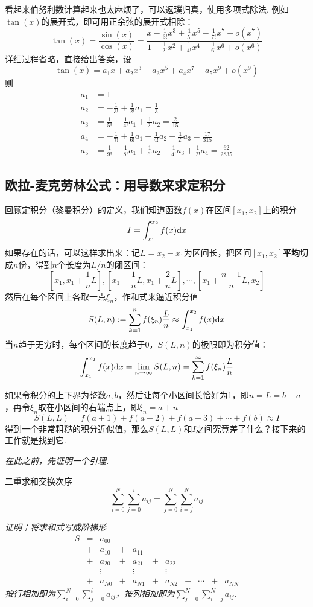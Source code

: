 \documentclass[main.tex]{subfiles}
\begin{document}
看起来伯努利数计算起来也太麻烦了，可以返璞归真，使用多项式除法. 例如\(\tan(x)\)的展开式，即可用正余弦的展开式相除：
\[ \tan(x) = \frac{\sin(x)}{\cos(x)} = \frac{x-\frac{1}{3!}x^3+\frac{1}{5!}x^5-\frac{1}{7!}x^7+o(x^7)} {1-\frac{1}{2!}x^2+\frac{1}{4!}x^4-\frac{1}{6!}x^6+o(x^6)}\]
详细过程省略，直接给出答案，设
\[ \tan(x) = a_1x+a_2x^3+a_3x^5+a_4x^7+a_5x^9+o(x^9)\]
则
\begin{align*}
    a_1 &= 1\\
    a_2 &= -\frac{1}{3!}+\frac{1}{2!}a_1 = \frac{1}{3} \\
    a_3 &= \frac{1}{5!}-\frac{1}{4!}a_1+\frac{1}{2!}a_2 = \frac{2}{15} \\
    a_4 &= -\frac{1}{7!}+\frac{1}{6!}a_1-\frac{1}{4!}a_2+\frac{1}{2!}a_3 = \frac{17}{315} \\
    a_5 &= \frac{1}{9!}-\frac{1}{8!}a_1+\frac{1}{6!}a_2-\frac{1}{4!}a_3+\frac{1}{2!}a_4 = \frac{62}{2835}
\end{align*}

\subsection{欧拉-麦克劳林公式：用导数来求定积分}

回顾定积分（黎曼积分）的定义，我们知道函数\(f(x)\)在区间\([x_1,x_2]\)上的积分
\[I = \int_{x_1}^{x_2} f(x){\rm d}x\]
如果存在的话，可以这样求出来：记\(L=x_2-x_1\)为区间长，把区间\([x_1,x_2]\)\textbf{平均}切成\(n\)份，得到\(n\)个长度为\(L/n\)的\textbf{闭}区间：
\[[x_1,x_1+\frac{1}{n}L],[x_1+\frac{1}{n}L,x_1+\frac{2}{n}L],\cdots,[x_1+\frac{n-1}{n}L,x_2]\]
然后在每个区间上各取一点\(\xi_n\)，作和式来逼近积分值
\[S(L,n) := \sum_{k=1}^{n}f(\xi_n)\frac{L}{n} \approx \int_{x_1}^{x_2} f(x){\rm d}x\]
当\(n\)趋于无穷时，每个区间的长度趋于0，\(S(L,n)\)的极限即为积分值：
\[\int_{x_1}^{x_2} f(x){\rm d}x = \lim_{n\to\infty}S(L,n) = \sum_{k=1}^{\infty}f(\xi_n)\frac{L}{n}\]

如果令积分的上下界为整数\(a,b\)，然后让每个小区间长恰好为1，即\(n=L=b-a\)，再令\(\xi_n\)取在小区间的右端点上，即\(\xi_n=a+n\)
\[S(L,L)=f(a+1)+f(a+2)+f(a+3)+\cdots+f(b) \approx I\]
得到一个非常粗糙的积分近似值，那么\(S(L,L)\)和\(I\)之间究竟差了什么？接下来的工作就是找到它.

\textit{
    在此之前，先证明一个引理.
}

\begin{lemma}{二重求和交换次序}
    \[\sum_{i=0}^{N}\sum_{j=0}^{i}a_{ij}=\sum_{j=0}^{N}\sum_{i=j}^{N}a_{ij}\]
\end{lemma}
\textit{证明；将求和式写成阶梯形}
\[\begin{array}{ccccccccccc}
    S & = & a_{00} &&&&&&&&\\
    & + & a_{10} & + & a_{11} &&&&&&\\
    & + & a_{20} & + & a_{21} & + & a_{22} &&&&\\
    && \vdots && \vdots && \vdots &&&&\\
    & + & a_{N0} & + & a_{N1} & + & a_{N2} & + & \cdots & + & a_{NN}
\end{array}\]
\textit{按行相加即为\(\displaystyle{\sum_{i=0}^{N}\sum_{j=0}^i a_{ij}}\)，按列相加即为\(\displaystyle{\sum_{j=0}^{N}\sum_{i=j}^{N}a_{ij}}\).}
\end{document}
